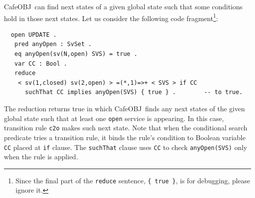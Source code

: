 \documentclass[12pt]{report}
\newcommand{\stt}[1]{{\small{\tt {#1}}}}
\newcommand{\cafeobj}{{\sf CafeOBJ}~}
\begin{document}
\cafeobj can find next states of a given global state such that some
conditions hold in those next states. Let us consider the following
code fragment\footnote{Since the final part of the {\tt reduce} sentence,
  {\tt \{~true~\}}, is for debugging, please ignore it.}:
\small
\begin{verbatim}
  open UPDATE .
   pred anyOpen : SvSet .
   eq anyOpen(sv(N,open) SVS) = true .
   var CC : Bool .
   reduce 
    < sv(1,closed) sv(2,open) > =(*,1)=>+ < SVS > if CC
      suchThat CC implies anyOpen(SVS) { true } .        -- to true.
\end{verbatim}
\normalsize
The reduction returns true in which \cafeobj finds any
next states of the given global state such that at least one {\tt open} service is
appearing. In this case, transition rule {\tt c2o} makes such next
state.  Note that when the conditional search predicate tries a transition
rule, it binds the rule's condition to Boolean variable {\tt CC} placed at {\tt i\!f} clause. The {\tt suchThat}
clause uses {\tt CC} to check \stt{anyOpen(SVS)} only when the rule is
applied.
\end{document}
